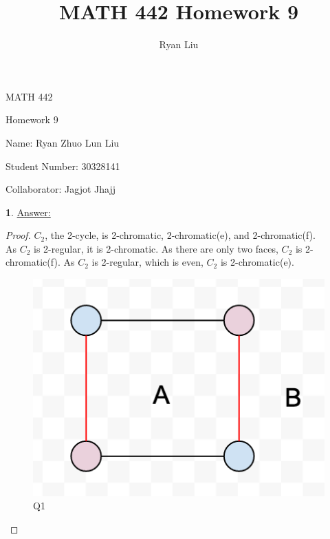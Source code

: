 \documentclass[12pt,a4paper]{article}
\author{Ryan Liu}
\title{MATH 442 Homework 9}
\theoremstyle{definition}
\newtheorem{problem}{}
\begin{document}
\begin{center}
{\huge MATH 442 \par}
{\Large Homework  9  \par}
{\normalsize Name: Ryan Zhuo Lun Liu \par}
{\normalsize Student Number: 30328141 \par}
{\normalsize Collaborator: Jagjot Jhajj \par}
\end{center}

\begin{problem} \underline{Answer:}
\begin{proof} 
$C_2$, the 2-cycle, is 2-chromatic, 2-chromatic(e), and 2-chromatic(f). \\

As $C_2$ is 2-regular, it is 2-chromatic. As there are only two faces, $C_2$ is 2-chromatic(f). As $C_2$ is 2-regular, which is even, $C_2$ is 2-chromatic(e).

\begin{figure}[H]
    \centering
    \includegraphics[scale=0.5]{q1.png}
    \caption{Q1}
    \label{fig:my_label}
\end{figure}
\end{proof}
\end{problem}
\end{document}
